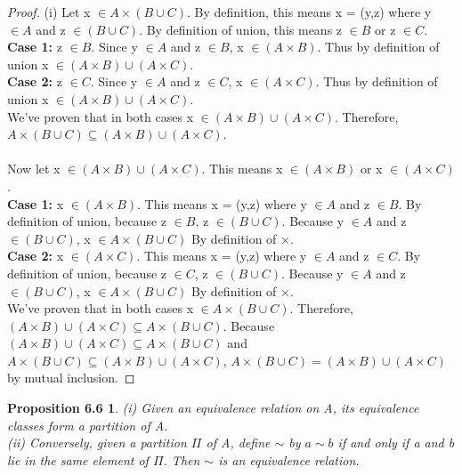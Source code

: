 \documentclass[12pt]{amsart}
\begin{document}
\begin{proof}
	(i) Let x $\in A \times (B \cup C)$. By definition, this means x = (y,z) where y $\in A$ and z $\in (B \cup C)$. By definition of union, this means z $\in B$ or z $\in C$.
	\\\textbf{Case 1:} z $\in B$. Since y $\in A$ and z $\in B$, x $\in (A \times B)$. Thus by definition of union x $\in (A \times B) \cup (A \times C)$.
	\\\textbf{Case 2:} z $\in C$. Since y $\in A$ and z $\in C$, x $\in (A \times C)$. Thus by definition of union x $\in (A \times B) \cup (A \times C)$.
	\\\indent We've proven that in both cases x $\in (A \times B) \cup (A \times C)$. Therefore, $A \times (B \cup C) \subseteq (A \times B) \cup (A \times C)$.
	\\ \\\indent Now let x $\in (A \times B) \cup (A \times C)$. This means x $\in (A \times B)$ or x $\in (A \times C)$.
	\\\textbf{Case 1:} x $\in (A \times B)$. This means x = (y,z) where y $\in A$ and z $\in B$. By definition of union, because z $\in B$, z $\in (B \cup C)$. Because y $\in A$ and z $\in (B \cup C)$, x $\in A \times (B \cup C)$ By definition of $\times$.
	\\\textbf{Case 2:}  x $\in (A \times C)$. This means x = (y,z) where y $\in A$ and z $\in C$. By definition of union, because z $\in C$, z $\in (B \cup C)$. Because y $\in A$ and z $\in (B \cup C)$, x $\in A \times (B \cup C)$ By definition of $\times$.
	\\\indent We've proven that in both cases x $\in A \times (B \cup C)$. Therefore, $(A \times B) \cup (A \times C) \subseteq A \times (B \cup C)$.
	Because $(A \times B) \cup (A \times C) \subseteq A \times (B \cup C)$ and $A \times (B \cup C) \subseteq (A \times B) \cup (A \times C)$, $A \times (B \cup C) = (A \times B) \cup (A \times C)$ by mutual inclusion.

\end{proof}

\newtheorem*{prop6.6}{Proposition 6.6}
\begin{prop6.6}
(i) Given an equivalence relation on A, its equivalence classes form a partition of A. 
\\\indent (ii) Conversely, given a partition $\Pi$ of A, define $\sim$ by $a \sim b$ if and only if a and b lie in the same element of $\Pi$. Then $\sim$ is an equivalence relation.
\end{prop6.6}
\end{document}

